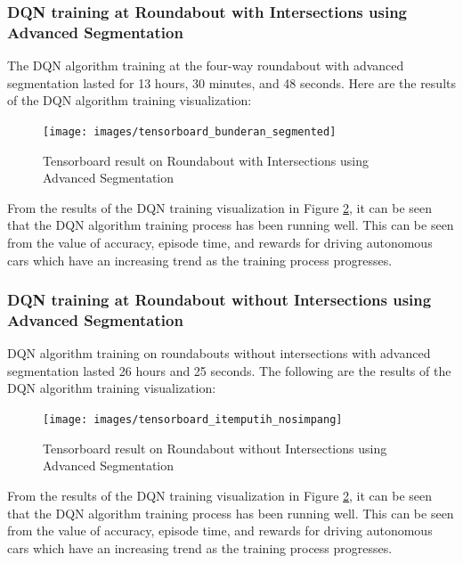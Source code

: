 \documentclass[conference]{IEEEtran}
\begin{document}
	\subsubsection{DQN training at Roundabout with Intersections using Advanced Segmentation}
	\label{sec:training_dqn_bundaran_simpangempat_segmentasi_hitam_putih}
	
	The DQN algorithm training at the four-way roundabout with advanced segmentation lasted for 13 hours, 30 minutes, and 48 seconds. Here are the results of the DQN algorithm training visualization:
	
	\begin{figure}[H] 
		\centering
		\texttt{[image: images/tensorboard\_bunderan\_segmented]}
		\caption{Tensorboard result on Roundabout with Intersections using Advanced Segmentation}
		\label{fig:tensorboard_bundaran_simpangempat_segmentasi_lanjutan}
	\end{figure}
	
	From the results of the DQN training visualization in Figure  \ref{fig:tensorboard_bundaran_tanpasimpang_segmentasi_lanjutan}, it can be seen that the DQN algorithm training process has been running well. This can be seen from the value of accuracy, episode time, and rewards for driving autonomous cars which have an increasing trend as the training process progresses.
	
	
	\subsubsection{DQN training at Roundabout without Intersections using Advanced Segmentation}
	\label{sec:training_dqn_bundaran_nosimpang_segmentasi_hitam_putih}
	
	DQN algorithm training on roundabouts without intersections with advanced segmentation lasted 26 hours and 25 seconds. The following are the results of the DQN algorithm training visualization:
	
	\begin{figure}[H] 
		\centering
		\texttt{[image: images/tensorboard\_itemputih\_nosimpang]}
		\caption{Tensorboard result on Roundabout without Intersections using Advanced Segmentation}
		\label{fig:tensorboard_bundaran_tanpasimpang_segmentasi_lanjutan}
	\end{figure}
	
	From the results of the DQN training visualization in Figure  \ref{fig:tensorboard_bundaran_tanpasimpang_segmentasi_lanjutan}, it can be seen that the DQN algorithm training process has been running well. This can be seen from the value of accuracy, episode time, and rewards for driving autonomous cars which have an increasing trend as the training process progresses.
	
\end{document}
